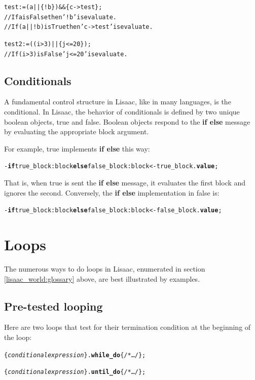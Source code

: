 \documentclass[11pt]{mybook}
\begin{document}
\begin{alltt} 
      test := (a || \{! b\}) && \{c -> test\};
      // If a is False then '! b' is evaluate.
      // If (a || {! b}) is True then 'c -> test' is evaluate.

      test2 := ((i>3) || \{j<=20\});
      // If (i>3) is False 'j<=20' is evaluate.
\end{alltt}

\subsection{Conditionals}
\label{lisaac_world:boolean_conditionals:conditionals}
%
A fundamental control structure in Lisaac, like in many languages, is
the conditional.  
In Lisaac{}, the behavior of conditionals is defined by two 
unique boolean objects, {\sc{}true} and {\sc{}false}. 
Boolean objects respond to the {\bf{}if else} message by evaluating 
the appropriate {\sc{}block} argument. 

For example, {\sc{}true} implements {\bf{}if else} this way: 
\begin{alltt} 
- {\bf{}if} true_block:{\sc{}block} {\bf{}else} false_block:{\sc{}block} <- true_block.{\bf{}value};  
\end{alltt}
That is, when {\sc{}true} is sent the {\bf{}if else} message, it
evaluates the first block and ignores the second. 
Conversely, the {\bf{}if else} implementation in {\sc{}false} is:
\begin{alltt} 
- {\bf{}if} true_block:{\sc{}block} {\bf{}else} false_block:{\sc{}block} <- false_block.{\bf{}value};  
\end{alltt}

\section{Loops}
\label{lisaac_world:loops}
%
The numerous ways to do loops in Lisaac{}, enumerated in section
\ref{lisaac_world:glossary} above, are best illustrated by examples. 

\subsection{Pre-tested looping}
\label{lisaac_world:loops:pre-tested}
%
Here are two loops that test for their termination condition 
at the beginning of the loop:
\begin{alltt} 
    \{ {\it{}conditional expression} \}.{\bf{}while\_do} \{ /* \ldots */ \};

    \{ {\it{}conditional expression} \}.{\bf{}until\_do} \{ /* \ldots */ \};  
\end{alltt}
  
\end{document}
